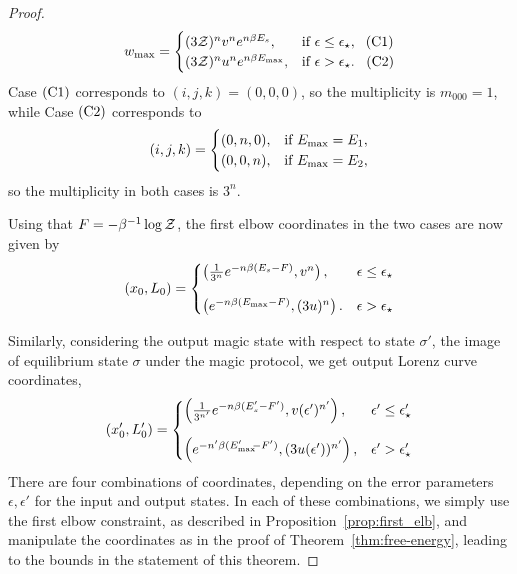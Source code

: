 \documentclass[pra,
aps,
twocolumn,
superscriptaddress,
groupedaddress,
nofootinbib,
reprint
]{revtex4-1}
\begin{document}
\begin{proof}
\begin{equation*}
w_{\rm max} =
	\begin{cases}
		(3\mathcal{Z})^{n} v^n e^{n\beta E_s}, &\mbox{if }\epsilon \leq \epsilon_{\star},\ \hspace{3pt}\rm{(C1)}\\
		(3\mathcal{Z})^{n} u^n e^{n\beta E_{\rm{max}}}, &\mbox{if }\epsilon > \epsilon_{\star}.\ \hspace{5pt}\rm{(C2)} 
	\end{cases}
\end{equation*}
Case $\rm{(C1)}$ corresponds to $(i,j,k) = (0,0,0)$, so the multiplicity is $m_{000} = 1$, while
Case $\rm{(C2)}$ corresponds to
\begin{equation}
	(i,j,k) = 
	\begin{cases}
	(0,n,0), &\text{if } E_{\rm{max}} = E_1, \\
	(0,0,n), &\text{if } E_{\rm{max}} = E_2,
	\end{cases}
\end{equation}
so the multiplicity in both cases is $3^n$.

Using that $F = -\beta^{-1} \log \mathcal{Z}$, the first elbow coordinates in the two cases are now given by
\begin{equation}\label{eq:first_elb_coords}
	(x_0, L_0) =
	\begin{cases}
		\left(\frac{1}{3^n} e^{-n\beta (E_s - F)}, v^n \right), &\epsilon \leq \epsilon_\star \vspace{10pt}\\
		\left( e^{-n\beta (E_{\rm{max}}-F)}, (3u)^n \right). &\epsilon > \epsilon_\star
	\end{cases}
\end{equation}

Similarly, considering the output magic state with respect to state $\sigma'$, the image of equilibrium state $\sigma$ under the magic protocol, we get output Lorenz curve coordinates,
\begin{equation}\label{eq:transformed_first_elb_coords}
	(x'_0, L'_0) =
	\begin{cases}
		\left(\frac{1}{3^{n'}} e^{-n\beta (E'_s - F')}, v(\epsilon')^{n'} \right), &\epsilon' \leq \epsilon'_\star \vspace{10pt}\\
		\left( e^{-n'\beta (E'_{\rm{max}}\hspace{-2.5pt}-F')}, (3u(\epsilon'))^{n'} \right), &\epsilon' > \epsilon'_\star
	\end{cases}
\end{equation}
There are four combinations of coordinates, depending on the error parameters $\epsilon, \epsilon'$ for the input and output states.
In each of these combinations, we simply use the first elbow constraint, as described in Proposition~\ref{prop:first_elb}, and manipulate the coordinates as in the proof of Theorem~\ref{thm:free-energy}, leading to the bounds in the statement of this theorem.
\end{proof}
\end{document}
